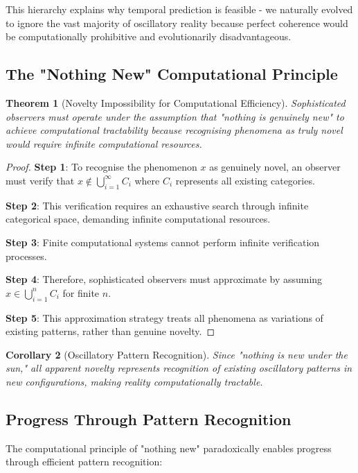 \documentclass[11pt]{article}
\newtheorem{theorem}{Theorem}[section]
\newtheorem{corollary}[theorem]{Corollary}
\theoremstyle{remark}
\begin{document}
This hierarchy explains why temporal prediction is feasible - we naturally evolved to ignore the vast majority of oscillatory reality because perfect coherence would be computationally prohibitive and evolutionarily disadvantageous.

\subsection{The "Nothing New" Computational Principle}

\begin{theorem}[Novelty Impossibility for Computational Efficiency]
Sophisticated observers must operate under the assumption that "nothing is genuinely new" to achieve computational tractability because recognising phenomena as truly novel would require infinite computational resources.
\end{theorem}

\begin{proof}
\textbf{Step 1}: To recognise the phenomenon $x$ as genuinely novel, an observer must verify that $x \notin \bigcup_{i=1}^{\infty} C_i$ where $C_i$ represents all existing categories.

\textbf{Step 2}: This verification requires an exhaustive search through infinite categorical space, demanding infinite computational resources.

\textbf{Step 3}: Finite computational systems cannot perform infinite verification processes.

\textbf{Step 4}: Therefore, sophisticated observers must approximate by assuming $x \in \bigcup_{i=1}^{n} C_i$ for finite $n$.

\textbf{Step 5}: This approximation strategy treats all phenomena as variations of existing patterns, rather than genuine novelty.
\end{proof}

\begin{corollary}[Oscillatory Pattern Recognition]
Since "nothing is new under the sun," all apparent novelty represents recognition of existing oscillatory patterns in new configurations, making reality computationally tractable.
\end{corollary}

\subsection{Progress Through Pattern Recognition}

The computational principle of "nothing new" paradoxically enables progress through efficient pattern recognition:
\end{document}
